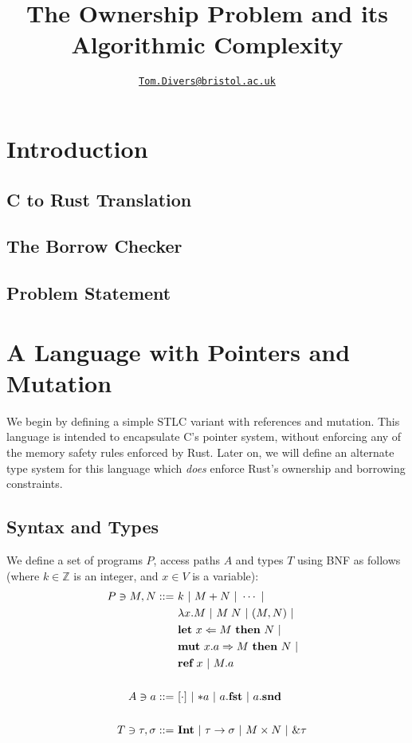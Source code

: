 \documentclass{article}
\title{The Ownership Problem and its Algorithmic Complexity}
\author{\href{mailto:oi24939@bristol.ac.uk}{\texttt{Tom.Divers@bristol.ac.uk}}}
\date{}
\newcommand{\agap}{\hspace{0.25em}}
\newcommand{\mkref}{\textbf{ref}~}
\newcommand{\mutate}[3]{\textbf{mut}~ #1 \Rightarrow #2 ~\textbf{then}~ #3}
\newcommand{\drfPth}{\mathbf{*}}
\newcommand{\letvar}[3]{\textbf{let}~ #1 \Leftarrow #2 ~\textbf{then}~ #3}
\begin{document}
\maketitle

\section{Introduction}

\subsection{C to Rust Translation}

\cite{zhang2023crown}

\subsection{The Borrow Checker}

\subsection{Problem Statement}

\section{A Language with Pointers and Mutation}

We begin by defining a simple STLC variant with references and mutation. This language is intended to encapsulate C's pointer system, without enforcing any of the memory safety rules enforced by Rust. Later on, we will define an alternate type system for this language which \textit{does} enforce Rust's ownership and borrowing constraints.


\subsection{Syntax and Types}

We define a set of programs $P$, access paths $A$ and types $T$ using BNF as follows (where $k \in \mathbb{Z}$ is an integer, and $x \in V$ is a variable):
\begin{align*}
    P \ni M, N ::=~ &k ~|~ M + N ~|~ \cdots ~|~\\ 
    &\lambda x . M ~|~ M \agap N ~|~ (M, N) ~|~\\ 
    &\letvar{x}{M}{N} ~|~\\ 
    &\mutate{x.a}{M}{N} ~|~\\
    &\mkref x ~|~ M.a\\    
    ~\\
    A \ni a ::=~ &[\cdot] ~|~ \drfPth a ~|~ a.\textbf{fst} ~|~ a.\textbf{snd}\\
    ~\\
    T \ni \tau, \sigma ::=~ &\textbf{Int} ~|~ \tau \rightarrow \sigma ~|~ M \times N ~|~ \& \tau
\end{align*}
 
\end{document}
